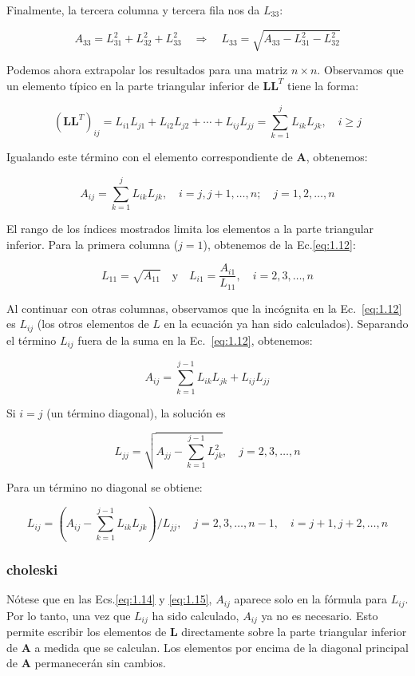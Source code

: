 \documentclass[12pt,letterpaper]{article}
\theoremstyle{definition}
\theoremstyle{plain}
\theoremstyle{remark}
\begin{document}
Finalmente, la tercera columna y tercera fila nos da $L_{33}$:

\[
A_{33} = L_{31}^2 + L_{32}^2 + L_{33}^2 \quad \Rightarrow \quad L_{33} = \sqrt{A_{33} - L_{31}^2 - L_{32}^2}
\]

Podemos ahora extrapolar los resultados para una matriz $n \times n$. Observamos que un elemento típico en la parte triangular inferior de $\mathbf{LL}^T$ tiene la forma:

\[
(\mathbf{LL}^T)_{ij} = L_{i1}L_{j1} + L_{i2}L_{j2} + \cdots + L_{ij}L_{jj} = \sum_{k=1}^{j} L_{ik}L_{jk}, \quad i \geq j
\]

Igualando este término con el elemento correspondiente de $\mathbf{A}$, obtenemos:

\[
A_{ij} = \sum_{k=1}^{j} L_{ik}L_{jk}, \quad i = j, j+1, \ldots, n; \quad j = 1, 2, \ldots, n \label{eq:1.12}
\tag{1.12}
\]

El rango de los índices mostrados limita los elementos a la parte triangular inferior. Para la primera columna ($j = 1$), obtenemos de la Ec.\eqref{eq:1.12}:

\[
L_{11} = \sqrt{A_{11}} \quad \text{y} \quad L_{i1} = \frac{A_{i1}}{L_{11}}, \quad i = 2, 3, \ldots, n
\tag{1.13}
\]

Al continuar con otras columnas, observamos que la incógnita en la Ec.~\eqref{eq:1.12} es $L_{ij}$ (los otros elementos de $L$ en la ecuación ya han sido calculados). Separando el término $L_{ij}$ fuera de la suma en la Ec.~\eqref{eq:1.12}, obtenemos:

\[
A_{ij} = \sum_{k=1}^{j-1} L_{ik}L_{jk} + L_{ij}L_{jj}
\]

Si $i = j$ (un término diagonal), la solución es

\[
L_{jj} = \sqrt{A_{jj} - \sum_{k=1}^{j-1} L_{jk}^2}, \quad j = 2, 3, \ldots, n
\label{eq:1.14}\tag{1.14}
\]

Para un término no diagonal se obtiene:

\[
L_{ij} = \left( A_{ij} - \sum_{k=1}^{j-1} L_{ik} L_{jk} \right) / L_{jj}, \quad
j = 2, 3, \ldots, n-1, \quad i = j+1, j+2, \ldots, n \label{eq:1.15}
\tag{1.15}
\]

\subsubsection{choleski}

Nótese que en las Ecs.\eqref{eq:1.14} y \eqref{eq:1.15}, $A_{ij}$ aparece solo en la fórmula para $L_{ij}$. Por lo tanto, una vez que $L_{ij}$ ha sido calculado, $A_{ij}$ ya no es necesario. Esto permite escribir los elementos de $\mathbf{L}$ directamente sobre la parte triangular inferior de $\mathbf{A}$ a medida que se calculan. Los elementos por encima de la diagonal principal de $\mathbf{A}$ permanecerán sin cambios.
\end{document}
